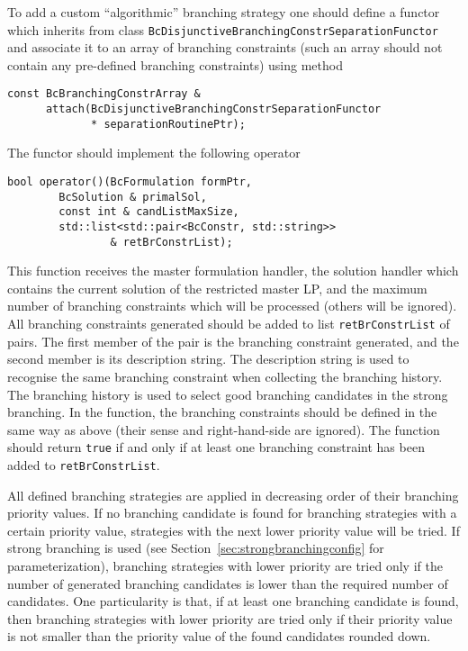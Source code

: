 \documentclass[10pt,a4paper]{article}
\begin{document}
To add a custom ``algorithmic'' branching strategy one should define a functor which inherits from class
\verb+BcDisjunctiveBranchingConstrSeparationFunctor+ and associate it to an array of branching constraints (such an array
should not contain any pre-defined branching constraints) using method
\begin{lstlisting}
const BcBranchingConstrArray & 
      attach(BcDisjunctiveBranchingConstrSeparationFunctor 
             * separationRoutinePtr);
\end{lstlisting}
The functor should implement the following operator
\begin{lstlisting}
bool operator()(BcFormulation formPtr,
		BcSolution & primalSol,
		const int & candListMaxSize,
		std::list<std::pair<BcConstr, std::string>> 
                & retBrConstrList);
\end{lstlisting}
This function receives the master formulation handler, the solution handler which contains the current solution of the
restricted master LP, and the maximum number of branching constraints which will be processed (others will be
ignored). All branching constraints generated should be added to list \verb+retBrConstrList+ of pairs. The first member
of the pair is the branching constraint generated, and the second member is its description string. The description
string is used to recognise the same branching constraint when collecting the branching history. The branching history
is used to select good branching candidates in the strong branching. In the function, the branching constraints should
be defined in the same way as above (their sense and right-hand-side are ignored). The function should return
\verb+true+ if and only if at least one branching constraint has been added to \verb+retBrConstrList+.

All defined branching strategies are applied in decreasing order of their branching priority values. If no branching
candidate is found for branching strategies with a certain priority value, strategies with the next lower priority value
will be tried. If strong branching is used (see Section~\ref{sec:strongbranchingconfig} for parameterization), branching
strategies with lower priority are tried only if the number of generated branching candidates is lower than the required
number of candidates. One particularity is that, if at least one branching candidate is found, then branching strategies
with lower priority are tried only if their priority value is not smaller than the priority value of the found
candidates rounded down.
\end{document}
